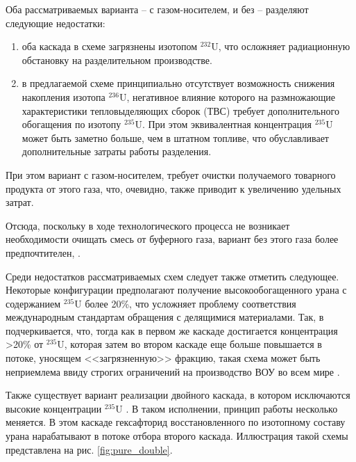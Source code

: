 Оба рассматриваемых варианта -- с газом-носителем, и без -- разделяют следующие недостатки:
\begin{enumerate}
  \item оба каскада в схеме загрязнены изотопом $^{232}$U, что осложняет радиационную обстановку на разделительном производстве.
  \item в предлагаемой схеме принципиально отсутствует возможность снижения накопления изотопа $^{236}$U, негативное влияние которого на размножающие характеристики тепловыделяющих сборок (ТВС) требует дополнительного обогащения по изотопу $^{235}$U. При этом эквивалентная концентрация $^{235}$U может быть заметно больше, чем в штатном топливе, что обуславливает дополнительные затраты работы разделения.
\end{enumerate}

При этом вариант с газом-носителем, требует очистки получаемого товарного продукта от этого газа, что, очевидно, также приводит к увеличению удельных затрат.

Отсюда, поскольку в ходе технологического процесса не возникает необходимости очищать смесь от буферного газа, вариант без этого газа более предпочтителен, \cite{smirnovKaskadnyeShemyZadachah2012}.

Среди недостатков рассматриваемых схем следует также отметить следующее.
Некоторые конфигурации предполагают получение высокообогащенного урана с содержанием $^{235}$U более 20\%, что усложняет проблему соответствия международным стандартам обращения с делящимися материалами.
Так, в \cite{palkinPurificationReprocessedUranium2016} подчеркивается, что, тогда как в первом же каскаде достигается концентрация >20\% от $^{235}$U, которая затем во втором каскаде еще больше повышается в потоке, уносящем <<загрязненную>> фракцию, такая схема может быть неприемлема ввиду строгих ограничений на производство ВОУ во всем мире \cite{ManagementHighEnriched2005}.

Также существует вариант реализации двойного каскада, в котором исключаются высокие концентрации $^{235}$U \cite{zhurinSposobIzotopnogoVosstanovleniya2010}.
В таком исполнении, принцип работы несколько меняется.
В этом каскаде гексафторид восстановленного по изотопному составу урана нарабатывают в потоке отбора второго каскада.
Иллюстрация такой схемы представлена на рис. \ref{fig:pure_double}.

